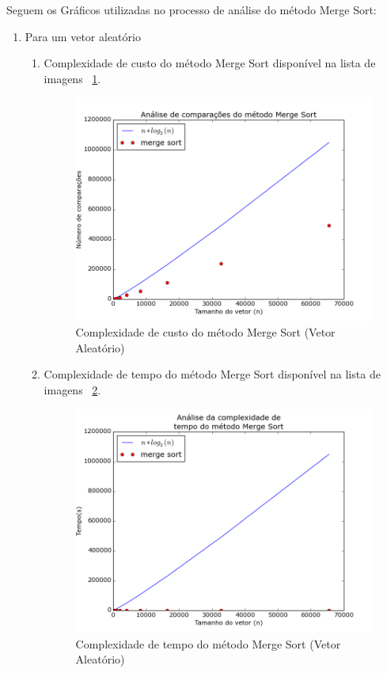 \documentclass[12pt,a4paper,twoside]{report}
\begin{document}
Seguem os Gráficos utilizadas no processo de análise do método Merge Sort:
\begin{enumerate}

	\item Para um vetor aleatório
	\begin{enumerate}
		\item Complexidade de custo do método Merge Sort disponível na lista de imagens ~\ref{fig:MergePlot1A}.
		\begin{figure}[!h]
			\centering
			\includegraphics[scale=0.6]{../imagens/Merge/merge_plot_1_aleatorio.png}
			\caption{Complexidade de custo do método Merge Sort (Vetor Aleatório) \label{fig:MergePlot1A}}
		\end{figure}


		\item Complexidade de tempo do método Merge Sort disponível na lista de imagens ~\ref{fig:MergePlot2A}.
		\begin{figure}[!h]
			\centering
			\includegraphics[scale=0.6]{../imagens/Merge/merge_plot_2_aleatorio.png}
			\caption{Complexidade de tempo do método Merge Sort (Vetor Aleatório)\label{fig:MergePlot2A}}
		\end{figure}



\end{enumerate}
\end{enumerate}
\end{document}
